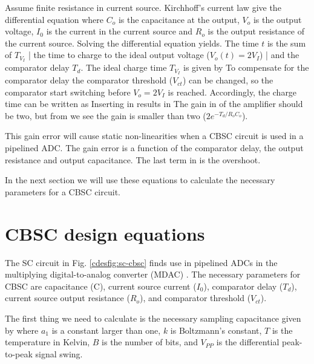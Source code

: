Assume finite resistance in current source. Kirchhoff's current law give the
differential equation
where $C_o$ is the capacitance at the output, $V_o$ is the
 output voltage, $I_0$ is the current in the current source and
$R_o$ is the output resistance of the current source. Solving the
differential equation yields.
The time $t$ is the sum of $T_{V_I}$ | the time to charge to the ideal
output voltage ($V_o(t) = 2V_I$) | and the comparator delay
$T_d$. The ideal charge time $T_{V_I}$ is given by
To compensate for the comparator delay the comparator threshold
($V_{ct}$) can be changed, so
the comparator start switching before $V_o = 2V_I$ is reached. Accordingly,
the charge time can be written as
Inserting  in  results in
The gain in of the amplifier should be two, but from  we
see the gain is smaller than two ($2e^{-T_d/R_oC_o}$).

 This gain error will cause
static non-linearities when a CBSC circuit is used in a pipelined
ADC. The gain error is a function of the comparator delay, the output
resistance and output capacitance. 
The last term in  is the
overshoot. 

In the next section we will use these equations to calculate the
necessary parameters for a CBSC circuit.

\section{CBSC design equations}\label{cdessc:design}
The SC circuit in Fig. \ref{cdesfig:sc-cbsc} finds use in pipelined ADCs
in the multiplying digital-to-analog converter (MDAC)
\cite{andersen05}. The necessary parameters for CBSC are capacitance
(C), current source current ($I_0$), comparator delay ($T_d$), current
source output resistance ($R_o$), and comparator threshold 
($V_{ct}$).

The first thing we need to calculate is the necessary sampling
capacitance given by \cite{wulff07}
where $a_1$ is a constant larger than one, $k$ is Boltzmann's constant, $T$ is the
temperature in Kelvin, $B$ is the number of bits, and $V_{PP}$ is the
differential peak-to-peak signal swing. 

